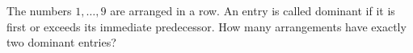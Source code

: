 The numbers $1,\ldots,9$ are arranged in a row. An entry is called dominant if it is first or exceeds its immediate predecessor. How many arrangements have exactly two dominant entries?
